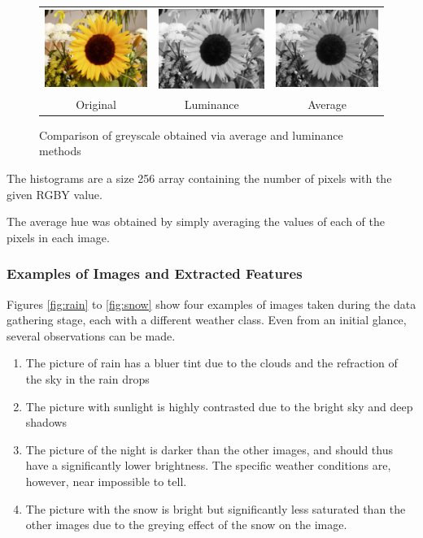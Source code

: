 \documentclass[a4paper,12pt,twoside]{report}
\begin{document}
\begin{figure}[H]
  \centering
  \begin{tabular}{ccc}
  \includegraphics[scale=1]{sunflower-original.png} &
  \includegraphics[scale=1]{sunflower-luminance.png} &
  \includegraphics[scale=1]{sunflower-average.png} \\
  Original & Luminance & Average \\
  \end{tabular}
  \caption{Comparison of greyscale obtained via average and luminance methods}
  \label{sunflower}
\end{figure}

The histograms are a size 256 array containing the number of pixels with the given RGBY value.

The average hue was obtained by simply averaging the values of each of the pixels in each image.


\subsubsection{Examples of Images and Extracted Features}
Figures \ref{fig:rain} to \ref{fig:snow} show four examples of images taken during the data gathering stage, each with a different weather class. Even from an initial glance, several observations can be made.
\begin{enumerate}
  \item The picture of rain has a bluer tint due to the clouds and the refraction of the sky in the rain drops
  \item The picture with sunlight is highly contrasted due to the bright sky and deep shadows
  \item The picture of the night is darker than the other images, and should thus have a significantly lower brightness. The specific weather conditions are, however, near impossible to tell.
  \item The picture with the snow is bright but significantly less saturated than the other images due to the greying effect of the snow on the image.
\end{enumerate}
\end{document}
